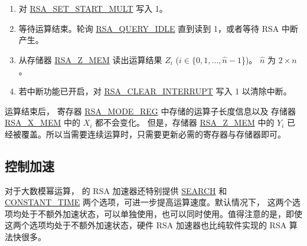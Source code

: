 \documentclass[main\_\_CN.tex]{subfiles}
\begin{document}
\begin{enumerate}
        只需要根据运算子长度，将这两个运算子中有效的数据写入存储器，没有使用到的存储器可以是任意值。

    \item 对 \hyperref[fielddesc:RSASETSTARTMULT]{RSA\_SET\_START\_MULT} 写入 1。

    \item 等待运算结束。轮询 \hyperref[fielddesc:RSAQUERYIDLE]{RSA\_QUERY\_IDLE} 直到读到 1，或者等待 RSA 中断产生。

    \item 从存储器 \hyperref[tab:rsa-mem]{RSA\_Z\_MEM} 读出运算结果 \begin{math}Z_{i}\end{math} (\begin{math}i \in \{ 0, 1, \dots, \hat{n}-1 \end{math}\})。
        \begin{math}\hat{n}\end{math} 为  \begin{math} 2 \times n \end{math}。

    \item 若中断功能已开启，对 \hyperref[fielddesc:RSACLEARINTERRUPT]{RSA\_CLEAR\_INTERRUPT} 写入 1 以清除中断。

\end{enumerate}

运算结束后，
寄存器 \hyperref[regdesc:RSAMODEREG]{RSA\_MODE\_REG} 中存储的运算子长度信息以及
存储器 \hyperref[tab:rsa-mem]{RSA\_X\_MEM} 中的 \begin{math}{X}_{i}\end{math} 都不会变化。
但是，存储器 \hyperref[tab:rsa-mem]{RSA\_Z\_MEM} 中的 \begin{math}{Y}_{i}\end{math}
已经被覆盖。所以当需要连续运算时，只需要更新必需的寄存器与存储器即可。


\subsection{控制加速}\label{sec:Accelerate options}

对于大数模幂运算，\chipname{} 的 RSA 加速器还特别提供 \hyperref[regdesc:RSASEARCHENABLEREG]{SEARCH} 和 \hyperref[regdesc:RSACONSTANTTIMEREG]{CONSTANT\_TIME} 两个选项，可进一步提高运算速度。默认情况下， 这两个选项均处于不额外加速状态，可以单独使用，也可以同时使用。值得注意的是，即使这两个选项均处于不额外加速状态，硬件 RSA 加速器也比纯软件实现的 RSA 算法快很多。
\end{document}
